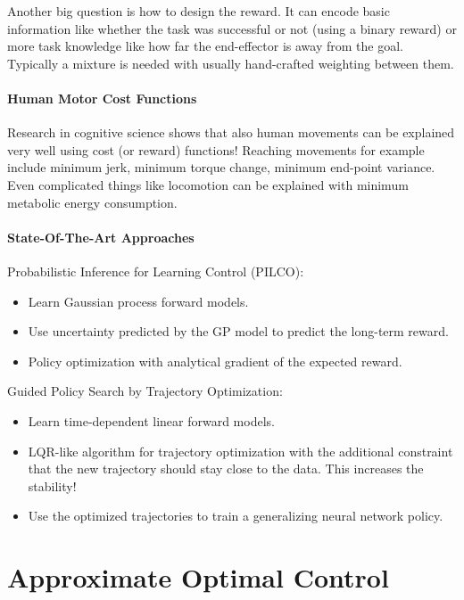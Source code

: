 				Another big question is how to design the reward. It can encode basic information like whether the task was successful or not (using a binary reward) or more task knowledge like how far the end-effector is away from the goal. Typically a mixture is needed with usually hand-crafted weighting between them.

			\subsubsection{Human Motor Cost Functions}
				Research in cognitive science shows that also human movements can be explained very well using cost (or reward) functions! Reaching movements for example include minimum jerk, minimum torque change, minimum end-point variance. Even complicated things like locomotion can be explained with minimum metabolic energy consumption.

			\subsubsection{State-Of-The-Art Approaches}
				Probabilistic Inference for Learning Control (PILCO):
				\begin{itemize}
					\item Learn Gaussian process forward models.
					\item Use uncertainty predicted by the GP model to predict the long-term reward.
					\item Policy optimization with analytical gradient of the expected reward.
				\end{itemize}
				Guided Policy Search by Trajectory Optimization:
				\begin{itemize}
					\item Learn time-dependent linear forward models.
					\item LQR-like algorithm for trajectory optimization with the additional constraint that the new trajectory should stay close to the data. This increases the stability!
					\item Use the optimized trajectories to train a generalizing neural network policy.
				\end{itemize}

\chapter{Approximate Optimal Control} %
	\label{c:approximateOptimalControl}

